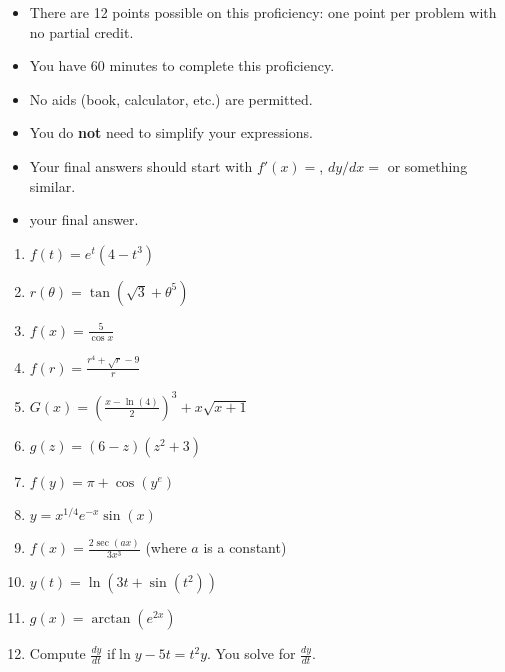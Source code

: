\documentclass[12pt]{article}
\newcommand{\ds}{\displaystyle}
\begin{document}
\begin{itemize}
\item 
There are 12 points possible on this proficiency: one point per problem with
no partial credit. 

\item You have 60 minutes to complete this proficiency.

\item No aids (book, calculator, etc.) are permitted.  

\item You do \textbf{not} need to simplify your expressions.

\item Your final answers should start with $f'(x)=$, $dy/dx=$ or
something similar.

\item {} your final answer.
\end{itemize}

\begin{enumerate}
\item $\ds f(t) = e^t(4 - t^3)$ \vfill
\item $\ds  r(\theta) = \tan\left(\sqrt3 + \theta^5\right)$ \vfill
\item $\ds f(x) = \frac{5}{\cos x}$\vfill
\newpage
\item $\ds f(r) = \frac{r^4 + \sqrt{r} - 9}{r}$\vfill
\item $\ds G(x) = \left(\frac{x - \ln(4)}{2}\right)^3 + x\sqrt{x + 1}$ \vfill
\item $\ds g(z) = (6-z)(z^2 + 3)$\vfill
\newpage
\item $\ds f(y) =  \pi + \cos(y^e)$ \vfill
\item $\ds y = x^{1/4}e^{-x}\sin(x)$\vfill
\item $\ds f(x) = \frac{2\sec(ax)}{3x^3}$ (where $a$ is a constant)\vfill

\newpage
\item $\ds y(t) = \ln(3t + \sin(t^2))$ \vfill
\item $\ds g(x) = \arctan(e^{2x})$ \vfill
\item Compute $\frac{dy}{dt}$ if\quad $\ln y - 5t = t^2y$. You  solve for $\frac{dy}{dt}$.
\vspace{3.5in}


\end{enumerate}
\end{document}

